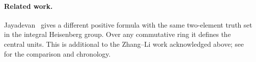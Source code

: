 
\paragraph{Related work.}
Jayadevan~\cite{jayadevan-21-106} gives a different positive formula
with the same two-element truth set in the integral Heisenberg group.
Over any commutative ring it defines the central units. This is
additional to the Zhang--Li work acknowledged above; see
\comparisonlocation{} for the comparison and chronology.
